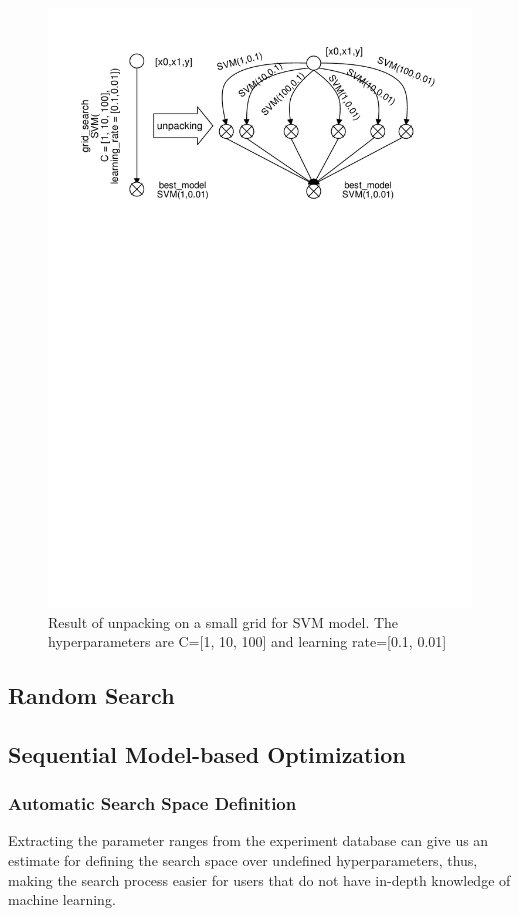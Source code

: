 \begin{figure}
\centering
\includegraphics[width=\columnwidth]{../images/grid-unpacking}
\caption{Result of unpacking on a small grid for SVM model. The hyperparameters are C=[1, 10, 100] and learning rate=[0.1, 0.01]}
\label{fig-grid-unpacking}
\end{figure}


\subsection{Random Search}

\subsection{Sequential Model-based Optimization}

\subsubsection{Automatic Search Space Definition}\label{sub-section-automatic-search-definition}
Extracting the parameter ranges from the experiment database can give us an estimate for defining the search space over undefined hyperparameters, thus, making the search process easier for users that do not have in-depth knowledge of machine learning.

